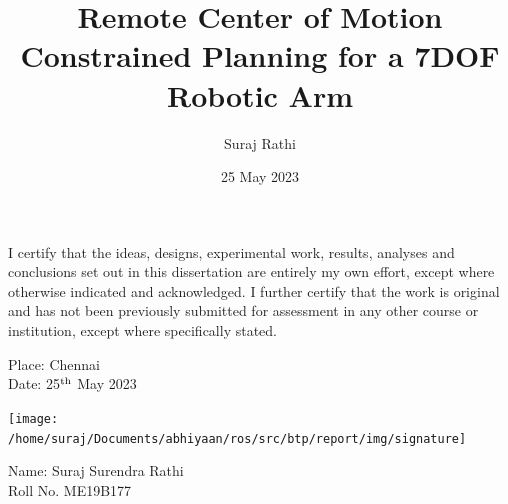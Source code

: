\documentclass[BTech]{iitmdiss}
\begin{document}
    \newcommand{\titleText}{Remote Center of Motion Constrained Planning for a 7DOF Robotic Arm}
    \newcommand{\authorText}{Suraj Rathi}
    \title{\titleText}

    \author{\authorText}

    \date{25 May 2023}

    \maketitle

    \declaration

    \vspace*{0.5in}

    \noindent I certify that the ideas, designs, experimental work, results, analyses and conclusions set out in this
    dissertation are entirely my own effort, except where otherwise indicated and acknowledged.
    I further certify that the work is original and has not been previously submitted for assessment in
    any other course or institution, except where specifically stated.

    \vspace*{0.5in}


    \begin{paracol}{2}
        \vspace*{1.0in}
        \begin{singlespacing}
            \hspace*{-0.25in}
            \parbox{2.5in}{
                \noindent Place: Chennai\\
                Date: 25$^{\textnormal{th}}$ May 2023
            }
        \end{singlespacing}

        \switchcolumn
        \begin{singlespacing}
            \texttt{[image: /home/suraj/Documents/abhiyaan/ros/src/btp/report/img/signature]}


            \hspace*{-0.25in}
            \parbox{2.5in}{
                \noindent Name: Suraj Surendra Rathi \\
                \noindent Roll No. ME19B177
            }


        \end{singlespacing}

    \end{paracol}
\end{document}
